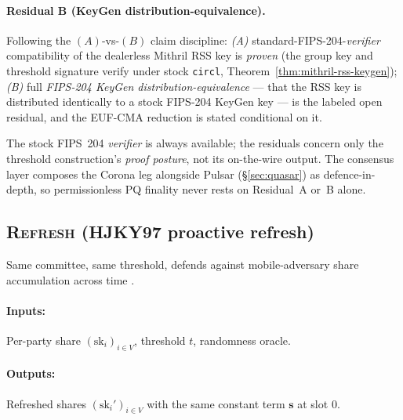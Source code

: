 \paragraph{Residual B (KeyGen distribution-equivalence).} Following the
$(A)$-vs-$(B)$ claim discipline: \emph{(A)} standard-FIPS-204-\emph{verifier}
compatibility of the dealerless Mithril RSS key is \emph{proven} (the group
key and threshold signature verify under stock \texttt{circl},
Theorem~\ref{thm:mithril-rss-keygen}); \emph{(B)} full \emph{FIPS-204
KeyGen distribution-equivalence} --- that the RSS key is distributed
identically to a stock FIPS-204 \textsf{KeyGen} key --- is the labeled open
residual, and the EUF-CMA reduction is stated conditional on it.

The stock FIPS~204 \emph{verifier} is always available; the residuals
concern only the threshold construction's \emph{proof posture}, not its
on-the-wire output. The consensus layer composes the Corona leg alongside
Pulsar (\S\ref{sec:quasar}) as defence-in-depth, so permissionless PQ
finality never rests on Residual~A or~B alone.

\subsection{\textsc{Refresh} (HJKY97 proactive refresh)}
\label{sec:protocol:refresh}

Same committee, same threshold, defends against mobile-adversary share
accumulation across time \cite{hjky97}.

\paragraph{Inputs:} Per-party share $(\mathrm{sk}_i)_{i \in V}$,
threshold $t$, randomness oracle.

\paragraph{Outputs:} Refreshed shares
$(\mathrm{sk}_i')_{i \in V}$ with the same constant term
$\mathbf{s}$ at slot $0$.

